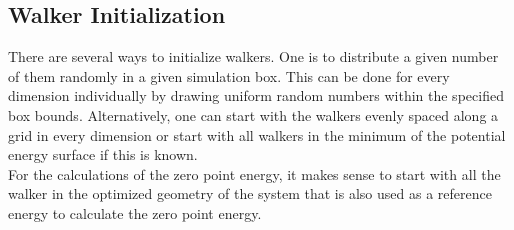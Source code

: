 \documentclass [12pt]{report}
\begin{document}
\subsection{Walker Initialization}
There are several ways to initialize walkers. One is to distribute a given number of them randomly in a given simulation box. This can be done for every dimension individually by drawing uniform random numbers within the specified box bounds. Alternatively, one can start with the walkers evenly spaced along a grid in every dimension or start with all walkers in the minimum of the potential energy surface if this is known. \\ 
For the calculations of the zero point energy, it makes sense to start with all the walker in the optimized geometry of the system that is also used as a reference energy to calculate the zero point energy.
\end{document}
